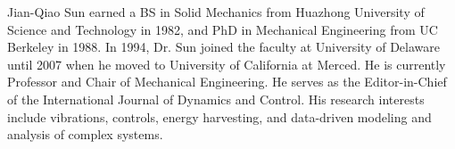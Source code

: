 \begin{biography}{Jian-Qiao Sun}
earned a BS in Solid Mechanics from Huazhong University of Science and Technology in 1982, and PhD in Mechanical Engineering from UC Berkeley in 1988.  In 1994, Dr. Sun joined the faculty at University of Delaware until 2007 when he moved to University of California at Merced. He is currently Professor and Chair of Mechanical Engineering. He serves as the Editor-in-Chief of the International Journal of Dynamics and Control.  His research interests include vibrations, controls, energy harvesting, and data-driven modeling and analysis of complex systems.
\end{biography}


